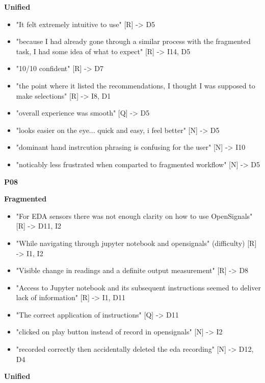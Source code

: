 \documentclass[
]{article}
\begin{document}
\textbf{Unified}

\begin{itemize}
\item
  "It felt extremely intuitive to use" {[}R{]} -\textgreater{} D5
\item
  "because I had already gone through a similar process with the fragmented task, I had some idea of what to expect" {[}R{]} -\textgreater{} I14, D5
\item
  "10/10 confident" {[}R{]} -\textgreater{} D7
\item
  "the point where it listed the recommendations, I thought I was supposed to make selections" {[}R{]} -\textgreater{} I8, D1
\item
  "overall experience was smooth" {[}Q{]} -\textgreater{} D5
\item
  "looks easier on the eye... quick and easy, i feel better" {[}N{]} -\textgreater{} D5
\item
  "dominant hand instrcution phrasing is confusing for the user" {[}N{]} -\textgreater{} I10
\item
  "noticably less frustrated when comparted to fragmented workflow" {[}N{]} -\textgreater{} D5
\end{itemize}

\textbf{P08}

\textbf{Fragmented}

\begin{itemize}
\item
  "For EDA sensors there was not enough clarity on how to use OpenSignals" {[}R{]} -\textgreater{} D11, I2
\item
  "While navigating through jupyter notebook and opensignals" (difficulty) {[}R{]} -\textgreater{} I1, I2
\item
  "Visible change in readings and a definite output measurement" {[}R{]} -\textgreater{} D8
\item
  "Access to Jupyter notebook and its subsequent instructions seemed to deliver lack of information" {[}R{]} -\textgreater{} I1, D11
\item
  "The correct application of instructions" {[}Q{]} -\textgreater{} D11
\item
  "clicked on play button instead of record in opensignals" {[}N{]} -\textgreater{} I2
\item
  "recorded correctly then accidentally deleted the eda recording" {[}N{]} -\textgreater{} D12, D4
\end{itemize}

\textbf{Unified}
\end{document}
